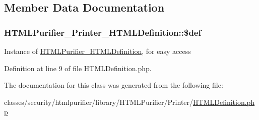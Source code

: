 \subsection{Member Data Documentation}
\hypertarget{classHTMLPurifier__Printer__HTMLDefinition_a76b1268721ebe6dc39f4a38844e67c9c}{
\subsubsection[{\$def}]{\setlength{\rightskip}{0pt plus 5cm}H\+T\+M\+L\+Purifier\+\_\+\+Printer\+\_\+\+H\+T\+M\+L\+Definition\+::\$def\hspace{0.3cm}{\ttfamily [protected]}}}\label{classHTMLPurifier__Printer__HTMLDefinition_a76b1268721ebe6dc39f4a38844e67c9c}
Instance of \hyperlink{classHTMLPurifier__HTMLDefinition}{H\+T\+M\+L\+Purifier\+\_\+\+H\+T\+M\+L\+Definition}, for easy access 

Definition at line 9 of file H\+T\+M\+L\+Definition.\+php.



The documentation for this class was generated from the following file\+:\begin{DoxyCompactItemize}
\item 
classes/security/htmlpurifier/library/\+H\+T\+M\+L\+Purifier/\+Printer/\hyperlink{Printer_2HTMLDefinition_8php}{H\+T\+M\+L\+Definition.\+php}\end{DoxyCompactItemize}
